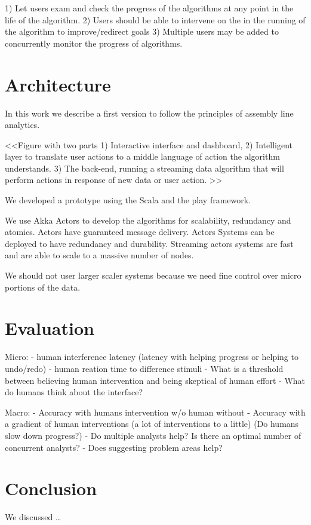 \documentclass{sig-alternate}
\begin{document}
1) Let users exam and check the progress of the algorithms at any point in the life of the algorithm.
2) Users should be able to intervene on the in the running of the algorithm to improve/redirect goals
3) Multiple users may be added to concurrently monitor the progress of algorithms.

\section{Architecture}
In this work we describe a first version to follow the principles of assembly line analytics.

<<Figure with two parts
1) Interactive interface and dashboard,
2) Intelligent layer to translate user actions to a middle language of action the algorithm understands.
3) The back-end, running a streaming data algorithm that will perform actions in response of new data or user action.
>>


We developed a prototype using the Scala and the play framework.

We use Akka Actors to develop the algorithms for scalability, redundancy and atomics.
  Actors have guaranteed message delivery.
  Actors Systems can be deployed to have redundancy and durability.
  Streaming actors systems are fast and are able to scale to a massive number of nodes.

  We should not user larger scaler systems because we need fine control over micro portions of the data.


\section{Evaluation}

Micro:
- human interference latency (latency with helping progress or helping to undo/redo)
- human reation time to difference stimuli
- What is a threshold between believing human intervention and being skeptical of human effort
- What do humans think about the interface?


Macro:
- Accuracy with humans intervention w/o human without
- Accuracy with a gradient of human interventions (a lot of interventions to a little) (Do humans slow down progress?)
- Do multiple analysts help? Is there an optimal number of concurrent analysts?
- Does suggesting problem areas help?





\section{Conclusion}

We discussed \ldots



\end{document}
